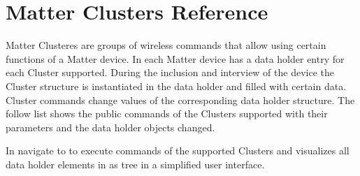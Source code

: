 \chapter{Matter Clusters Reference}
\label{cls}
\label{Clusters}

Matter Clusteres are groups of wireless commands that allow using certain functions of a Matter device.
In \zway each Matter device has a data holder entry for each Cluster supported. During the inclusion 
and interview of the device the Cluster structure is instantiated in the data holder and filled with 
certain data. Cluster commands change values of the corresponding data holder structure. The follow 
list shows the public commands of the Clusters supported with their parameters and the data holder 
objects changed.

In \zweui navigate to  to execute commands 
of the supported Clusters and visualizes all data holder elements in as tree in 
a simplified user interface.
